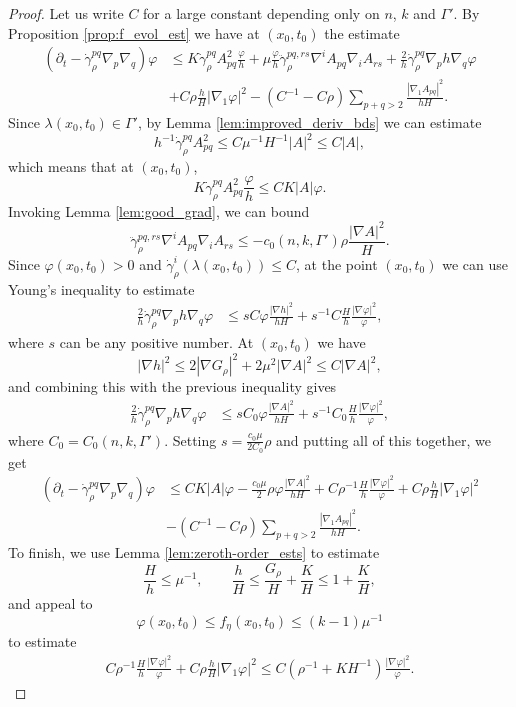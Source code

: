 \documentclass[12pt]{amsart}
\begin{document}
\begin{proof}
Let us write $C$ for a large constant depending only on $n$, $k$ and $\Gamma'$. By Proposition \ref{prop:f_evol_est} we have at $(x_0,t_0)$ the estimate
\begin{align*}
(\partial_t - \dot \gamma_\rho^{pq}\nabla_p \nabla_q) \varphi & \leq K\dot \gamma_\rho^{pq} A^2_{pq}\frac{\varphi}{h}  + \mu\frac{\varphi}{h} \ddot \gamma_\rho^{pq,rs}  \nabla^i A_{pq} \nabla_i A_{rs}+ \frac{2}{h} \dot \gamma_\rho^{pq} \nabla_p h\nabla_q \varphi \\
&+ C\rho \frac{h}{H} |\nabla_1 \varphi|^2  -(C^{-1}- C \rho) \sum_{p+q> 2} \frac{|\nabla_1 A_{pq}|^2}{h H}.
\end{align*}
Since $\lambda(x_0,t_0) \in \Gamma'$, by Lemma \ref{lem:improved_deriv_bds} we can estimate 
\[h^{-1} \dot \gamma_\rho^{pq} A^2_{pq}\leq C \mu^{-1} H^{-1} |A|^2 \leq C|A|,\]
which means that at $(x_0,t_0)$,
\[K\dot \gamma_\rho^{pq} A^2_{pq} \frac{\varphi}{h} \leq CK |A| \varphi.\]
Invoking Lemma \ref{lem:good_grad}, we can bound
\[\ddot \gamma_\rho^{pq,rs} \nabla^i A_{pq} \nabla_i A_{rs} \leq -c_0(n,k,\Gamma')\rho \frac{|\nabla A |^2}{H}.\]
Since $\varphi(x_0,t_0) > 0$ and $\dot \gamma_\rho^i(\lambda(x_0,t_0)) \leq C$, at the point $(x_0,t_0)$ we can use Young's inequality to estimate 
\begin{align*}
\frac{2}{h} \dot \gamma_\rho^{pq} \nabla_p h  \nabla_q \varphi&\leq  s C\varphi\frac{|\nabla h|^2}{h H} +  s^{-1} C\frac{H}{h} \frac{|\nabla \varphi|^2}{\varphi},
\end{align*}
where $s$ can be any positive number. At $(x_0,t_0)$ we have 
\[|\nabla h|^2 \leq 2|\nabla G_\rho|^2 + 2\mu^2 |\nabla A|^2  \leq C|\nabla A|^2,\]
and combining this with the previous inequality gives
\begin{align*}
\frac{2}{h} \dot \gamma_\rho^{pq} \nabla_p h \nabla_q \varphi &\leq  sC_0 \varphi\frac{|\nabla A|^2}{h H}+ s^{-1}C_0 \frac{H}{h} \frac{|\nabla \varphi|^2}{ \varphi } ,
\end{align*}
where $C_0 = C_0(n,k,\Gamma')$. Setting $s = \frac{c_0 \mu }{2C_0}\rho$ and putting all of this together, we get 
\begin{align*}
(\partial_t - \dot \gamma_\rho^{pq}\nabla_p \nabla_q) \varphi & \leq CK|A| \varphi  - \frac{c_0 \mu }{2} \rho \varphi \frac{|\nabla A|^2}{hH}+ C \rho^{-1} \frac{H}{h} \frac{|\nabla \varphi|^2}{ \varphi } + C\rho \frac{h}{H} |\nabla_1 \varphi|^2 \\
& -(C^{-1}- C \rho) \sum_{p+q> 2} \frac{|\nabla_1 A_{pq}|^2}{h H}.
\end{align*}
To finish, we use Lemma \ref{lem:zeroth-order_ests} to estimate
\[\frac{H}{h} \leq \mu^{-1}, \qquad \frac{h}{H}\leq \frac{G_\rho}{H} + \frac{K}{H} \leq 1 + \frac{K}{H},\]
and appeal to 
\[\varphi (x_0,t_0) \leq f_\eta(x_0,t_0) \leq (k-1) \mu^{-1}\]
to estimate
\begin{align*}
C \rho^{-1} \frac{H}{h} \frac{|\nabla \varphi|^2}{ \varphi } + C\rho \frac{h}{H} |\nabla_1 \varphi|^2 \leq C(\rho^{-1} + KH^{-1} )  \frac{|\nabla \varphi|^2}{ \varphi }.
\end{align*} 
\end{proof}
\end{document}
